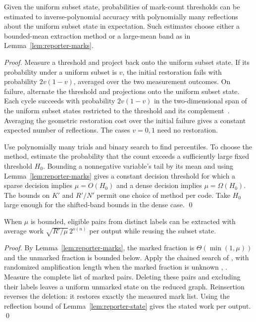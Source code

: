 \documentclass[runningheads,envcountsame,envcountsect,orivec]{llncs}
\begin{document}
\begin{lemma}
\label{lem:reporter-thresholds}
Given the uniform subset state, probabilities of
mark-count thresholds can be estimated to inverse-polynomial
accuracy with polynomially many reflections about the uniform subset state
in expectation. Such estimates choose either a bounded-mean
extraction method or a large-mean band as in
Lemma~\ref{lem:reporter-marks}.
\end{lemma}

\begin{proof}
Measure a threshold and project back onto the uniform subset state.
If its probability under a uniform subset is $v$, the initial restoration
fails with probability $2v(1-v)$, averaged over the two
measurement outcomes. On failure, alternate the threshold
and projections onto the uniform subset state. Each cycle succeeds with
probability $2v(1-v)$ in the two-dimensional span of the
uniform subset states restricted to the threshold and its
complement~\cite[Sections~2.5 and~4.1]{CMSZ21}. Averaging the
geometric restoration cost over the initial failure gives
a constant expected number of reflections. The cases
$v=0,1$ need no restoration.

Use polynomially many trials and binary search to find
percentiles. To choose the method, estimate the probability
that the count exceeds a sufficiently large fixed threshold
$H_0$. Bounding a nonnegative variable's tail by its mean and
using Lemma~\ref{lem:reporter-marks} gives a constant decision
threshold for which a sparse
decision implies $\mu=O(H_0)$ and a dense decision implies
$\mu=\Omega(H_0)$. The bounds on $K'$ and $R'/N'$ permit
one choice of method per code. Take $H_0$ large enough for
the shifted-band bounds in the dense case.
\qed
\end{proof}

\begin{lemma}
\label{lem:reporter-sparse}
When $\mu$ is bounded, eligible pairs from distinct labels
can be extracted with average work
$\sqrt{R'/\mu}\,2^{o(n)}$ per output while reusing the
subset state.
\end{lemma}

\begin{proof}
By Lemma~\ref{lem:reporter-marks}, the marked fraction is
$\Theta(\min(1,\mu))$ and the unmarked fraction is bounded
below. Apply the chained search of
\cite[Section~4]{BCSS23}, with randomized amplification
length when the marked fraction is unknown
\cite[Section~4]{BBHT98},
\cite[Corollary~2]{BLSS25}.
Measure the complete list of marked pairs. Deleting these
pairs and excluding their labels leaves a uniform unmarked
state on the reduced graph. Reinsertion reverses the deletion:
it restores exactly the measured mark list.
Using the reflection bound of Lemma~\ref{lem:reporter-state}
gives the stated work per output.
\qed
\end{proof}
\end{document}
